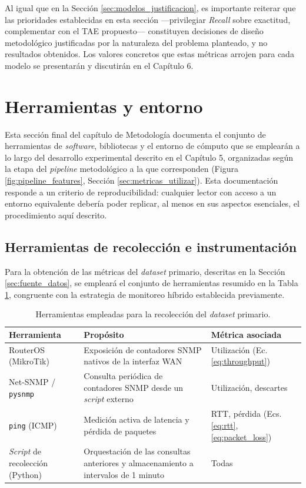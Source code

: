 \documentclass[12pt]{report}
\begin{document}
Al igual que en la Sección \ref{sec:modelos_justificacion}, es importante reiterar que las prioridades establecidas en esta sección ---privilegiar \textit{Recall} sobre exactitud, complementar con el TAE propuesto--- constituyen decisiones de diseño metodológico justificadas por la naturaleza del problema planteado, y no resultados obtenidos. Los valores concretos que estas métricas arrojen para cada modelo se presentarán y discutirán en el Capítulo 6.

\section{Herramientas y entorno}
\label{sec:herramientas_entorno}

Esta sección final del capítulo de Metodología documenta el conjunto de herramientas de \textit{software}, bibliotecas y el entorno de cómputo que se emplearán a lo largo del desarrollo experimental descrito en el Capítulo 5, organizadas según la etapa del \textit{pipeline} metodológico a la que corresponden (Figura \ref{fig:pipeline_features}, Sección \ref{sec:metricas_utilizar}). Esta documentación responde a un criterio de reproducibilidad: cualquier lector con acceso a un entorno equivalente debería poder replicar, al menos en sus aspectos esenciales, 
el procedimiento aquí descrito.

\subsection*{Herramientas de recolección e instrumentación}

Para la obtención de las métricas del \textit{dataset} primario, descritas en la Sección \ref{sec:fuente_datos}, se empleará el conjunto de herramientas resumido en la Tabla \ref{tab:herramientas_recoleccion}, congruente con la estrategia de monitoreo híbrido establecida previamente.

\begin{table}[H]
    \centering
    \begin{tabular}{|l|p{5cm}|l|}
        \hline
        \textbf{Herramienta} & \textbf{Propósito} & \textbf{Métrica asociada} \\
        \hline
        RouterOS (MikroTik) & Exposición de contadores SNMP nativos de la interfaz WAN & Utilización (Ec. \ref{eq:throughput}) \\
        \hline
        Net-SNMP / \texttt{pysnmp} & Consulta periódica de contadores SNMP desde un \textit{script} externo & Utilización, descartes \\
        \hline
        \texttt{ping} (ICMP) & Medición activa de latencia y pérdida de paquetes & RTT, pérdida (Ecs. \ref{eq:rtt}, \ref{eq:packet_loss}) \\
        \hline
        \textit{Script} de recolección (Python) & Orquestación de las consultas anteriores y almacenamiento a intervalos de 1 minuto & Todas \\
        \hline
    \end{tabular}
    \caption{Herramientas empleadas para la recolección del \textit{dataset} primario.}
    \label{tab:herramientas_recoleccion}
\end{table}
\end{document}
